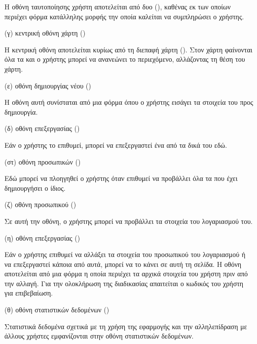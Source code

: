 Η οθόνη ταυτοποίησης χρήστη αποτελείται από δυο  (), καθένας εκ των οποίων περιέχει φόρμα κατάλληλης μορφής την οποία καλείται να συμπληρώσει ο χρήστης.

\item (γ) κεντρική οθόνη χάρτη (\textit{})

Η κεντρική οθόνη αποτελείται κυρίως από τη διεπαφή χάρτη (). Στον χάρτη φαίνονται όλα τα  και ο χρήστης μπορεί να ανανεώνει το περιεχόμενο, αλλάζοντας τη θέση του χάρτη.

\item (ε) οθόνη δημιουργίας νέου  (\textit{})

Η οθόνη αυτή συνίσταται από μια φόρμα όπου ο χρήστης εισάγει τα στοιχεία του  προς δημιουργία.

\item (δ) οθόνη επεξεργασίας  (\textit{})

Εάν ο χρήστης το επιθυμεί, μπορεί να επεξεργαστεί ένα από τα δικά του  εδώ.

\item (στ) οθόνη προσωπικών  (\textit{})

Εδώ μπορεί να πλοηγηθεί ο χρήστης όταν επιθυμεί να προβάλλει όλα τα  που έχει δημιουργήσει ο ίδιος.  

\item (ζ) οθόνη προσωπικού  (\textit{})

Σε αυτή την οθόνη, ο χρήστης μπορεί να προβάλλει τα στοιχεία του λογαριασμού του.

\item (η) οθόνη επεξεργασίας  (\textit{})

Εάν ο χρήστης επιθυμεί να αλλάξει τα στοιχεία του προσωπικού του λογαριασμού ή να επεξεργαστεί κάποια από αυτά, μπορεί να το κάνει σε αυτή τη σελίδα. Η οθόνη αποτελείται από μια φόρμα η οποία περιέχει τα αρχικά στοιχεία του χρήστη πριν από την αλλαγή. Για την ολοκλήρωση της διαδικασίας απαιτείται ο κωδικός του χρήστη για επιβεβαίωση. 

\item (θ) οθόνη στατιστικών δεδομένων (\textit{})

Στατιστικά δεδομένα σχετικά με τη χρήση της εφαρμογής και την αλληλεπίδραση με άλλους χρήστες εμφανίζονται στην οθόνη στατιστικών δεδομένων.


